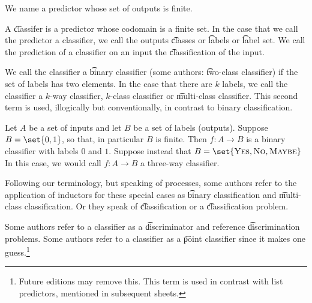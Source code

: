 

We name a predictor whose set of outputs is finite.


A \t{classifer} is a predictor whose codomain is a finite set.
In the case that we call the predictor a classifier, we call the outputs \t{classes} or \t{labels} or \t{label set}.
We call the prediction of a classifier on an input the \t{classification} of the input.

We call the classifier a \t{binary classifier} (some authors: \t{two-class classifier}) if the set of labels has two elements.
In the case that there are $k$ labels, we call the classifier a \t{$k$-way classifier}, \t{$k$-class classifier} or \t{multi-class classifier}.
This second term is used, illogically but conventionally, in contrast to binary classification.

Let $A$ be a set of inputs and let $B$ be a set of labels (outputs).
Suppose $B = \set{0, 1}$, so that, in particular $B$ is finite.
Then $f: A \to B$ is a binary classifier with labels $0$ and $1$.
Suppose instead that $B = \set{\text{\textsc{Yes}}, \textsc{No}, \textsc{Maybe}}$
In this case, we would call $f: A \to B$ a three-way classifier.


Following our terminology, but speaking of processes, some authors refer to the application of inductors for these special cases as \t{binary classification} and \t{multi-class classification}.
Or they speak of \t{classification} or a \t{classification problem}.

Some authors refer to a classifier as a \t{discriminator} and reference \t{discrimination problems}.
Some authors refer to a classifier as a \t{point classifier} since it makes one guess.\footnote{Future editions may remove this. This term is used in contrast with list predictors, mentioned in subsequent sheets.}

